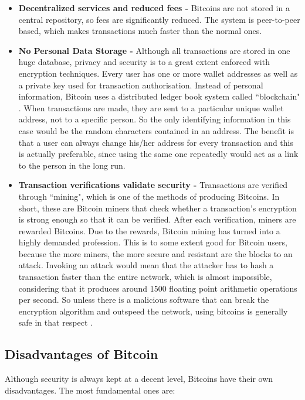 \documentclass[a4paper, 12pt, titlepage]{article}
\begin{document}
\begin{itemize}
\item{\textbf{Decentralized services and reduced fees - }}Bitcoins are not stored in a central repository, so fees are significantly reduced. The system is peer-to-peer based, which makes transactions much faster than the normal ones.
\item{\textbf{No Personal Data Storage - }}Although all transactions are stored in one huge database, privacy and security is to a great extent enforced with encryption techniques. Every user has one or more wallet addresses as well as a private key used for transaction authorisation. Instead of personal information, Bitcoin uses a distributed ledger book system called ``blockchain" \cite{WhatIsBTC}. When transactions are made, they are sent to a particular unique wallet address, not to a specific person. So the only identifying information in this case would be the random characters contained in an address. The benefit is that a user can always change his/her address for every transaction and this is actually preferable, since using the same one repeatedly would act as a link to the person in the long run.
\item{\textbf{Transaction verifications validate security - }}Transactions are verified through ``mining", which is one of the methods of producing Bitcoins. In short, these are Bitcoin miners that check whether a transaction's encryption is strong enough so that it can be verified. After each verification, miners are rewarded Bitcoins. Due to the rewards, Bitcoin mining has turned into a highly demanded profession. This is to some extent good for Bitcoin users, because the more miners, the more secure and resistant are the blocks to an attack. Invoking an attack would mean that the attacker has to hash a transaction faster than the entire network, which is almost impossible, considering that it produces around 1500 floating point arithmetic operations per second. So unless there is a malicious software that can break the encryption algorithm and outspeed the network, using bitcoins is generally safe in that respect \cite{WhatIsBTC}.
\end{itemize}

\subsection{Disadvantages of Bitcoin}
Although security is always kept at a decent level, Bitcoins have their own disadvantages. The most fundamental ones are: 
\end{document}
